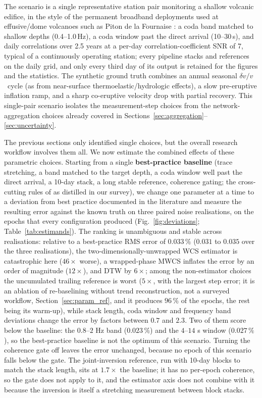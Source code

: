 \documentclass[
  referee]{gji}
\providecommand{\dvv}{\ensuremath{\delta v/v}}
\begin{document}
The scenario is a single representative station pair monitoring a
shallow volcanic edifice, in the style of the permanent broadband
deployments used at effusive/dome volcanoes such as Piton de la
Fournaise \citep{Brenguier2008}: a coda band matched to shallow depths
(0.4--1.0\(\,\)Hz), a coda window past the direct arrival
(10--30\(\,\)s), and daily correlations over 2.5 years at a per-day
correlation-coefficient SNR of 7, typical of a continuously operating
station; every pipeline stacks and references on the daily grid, and
only every third day of its output is retained for the figures and the
statistics. The synthetic ground truth combines an annual seasonal
\dvv~cycle (as from near-surface thermoelastic/hydrologic effects), a
slow pre-eruptive inflation ramp, and a sharp co-eruptive velocity drop
with partial recovery. This single-pair scenario isolates the
measurement-step choices from the network-aggregation choices already
covered in Sections~\ref{sec:aggregation}--\ref{sec:uncertainty}.

The previous sections only identified single choices, but the overall
research workflow involves them all. We now estimate the combined
effects of these parametric choices. Starting from a single
\textbf{best-practice baseline} (trace stretching, a band matched to the
target depth, a coda window well past the direct arrival, a 10-day
stack, a long stable reference, coherence gating; the cross-cutting
rules of \citeauthor{Brenguier2014}
\citetext{\citeyear{Brenguier2014}; \citealp{Weaver2011}; \citealp{Clarke2011}}
as distilled in our survey), we change one parameter at a time to a
deviation from best practice documented in the literature and measure
the resulting error against the known truth on three paired noise
realisations, on the epochs that every configuration produced
(Fig.~\ref{fig:deviations}; Table~\ref{tab:estimands}). The ranking is
unambiguous and stable across realisations: relative to a best-practice
RMS error of \(0.033\,\%\) (\(0.031\) to \(0.035\) over the three
realisations), the two-dimensionally-unwrapped WCS estimator is
catastrophic here (\(46\times\) worse), a wrapped-phase MWCS inflates
the error by an order of magnitude (\(12\times\)), and DTW by
\(6\times\); among the non-estimator choices the uncumulated trailing
reference is worst (\(5\times\), with the largest step error; it is an
ablation of re-baselining without trend reconstruction, not a surveyed
workflow, Section~\ref{sec:param_ref}, and it produces \(96\,\%\) of the
epochs, the rest being its warm-up), while stack length, coda window and
frequency band deviations change the error by factors between \(0.7\)
and \(2.3\). Two of them score below the baseline: the \(0.8\)--\(2\) Hz
band (\(0.023\,\%\)) and the \(4\)--\(14\) s window (\(0.027\,\%\)), so
the best-practice baseline is not the optimum of this scenario. Turning
the coherence gate off leaves the error unchanged, because no epoch of
this scenario falls below the gate. The joint-inversion reference, run
with 10-day blocks to match the stack length, sits at \(1.7\times\) the
baseline; it has no per-epoch coherence, so the gate does not apply to
it, and the estimator axis does not combine with it because the
inversion is itself a stretching measurement between block stacks.
\end{document}
